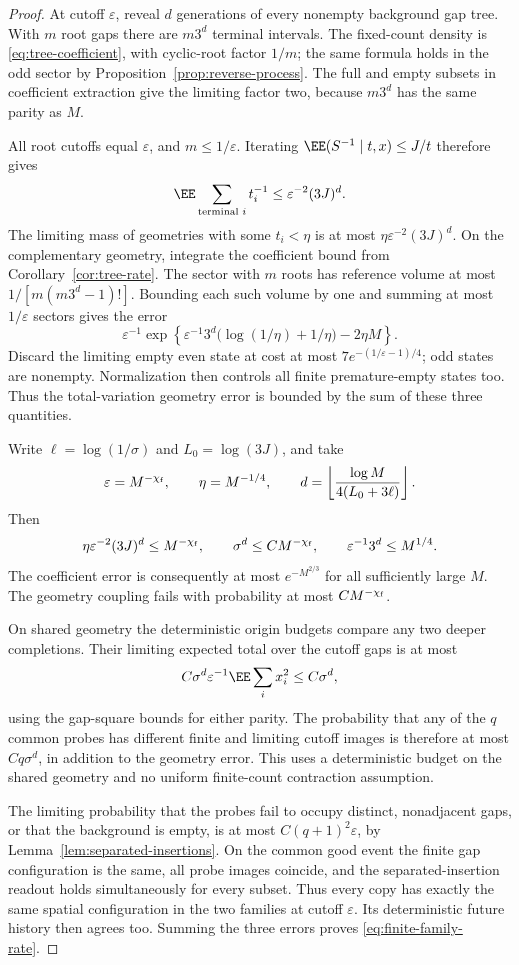 \documentclass[11pt,letterpaper]{article}
\begin{document}
\begin{proof}
At cutoff $\varepsilon$, reveal $d$ generations of every nonempty
background gap tree. With $m$ root gaps there are $m3^d$ terminal
intervals. The fixed-count density is \eqref{eq:tree-coefficient},
with cyclic-root factor $1/m$; the same formula holds in the odd
sector by Proposition~\ref{prop:reverse-process}. The full and empty
subsets in coefficient extraction give the limiting factor two,
because $m3^d$ has the same parity as $M$.

All root cutoffs equal $\varepsilon$, and $m\le1/\varepsilon$.
Iterating $\EE(S^{-1}\mid t,x)\le J/t$ therefore gives
\[
 \EE\sum_{\text{terminal }i}t_i^{-1}
       \le \varepsilon^{-2}(3J)^d.
\]
The limiting mass of geometries with some $t_i<\eta$ is at most
$\eta\varepsilon^{-2}(3J)^d$. On the complementary geometry,
integrate the coefficient bound from Corollary~\ref{cor:tree-rate}.
The sector with $m$ roots has reference volume at most
$1/[m(m3^d-1)!]$. Bounding each such volume by one and summing at
most $1/\varepsilon$ sectors gives the error
\[
 \varepsilon^{-1}\exp\left\{
   \varepsilon^{-1}3^d\bigl(\log(1/\eta)+1/\eta\bigr)-2\eta M
                         \right\}.
\]
Discard the limiting empty even state at cost at most
$7e^{-(1/\varepsilon-1)/4}$; odd states are nonempty.
Normalization then controls all finite premature-empty states too.
Thus the total-variation geometry error is bounded by the sum of
these three quantities.

Write $\ell=\log(1/\sigma)$ and $L_0=\log(3J)$, and take
\[
 \varepsilon=M^{-\chi_{\rm f}},\qquad \eta=M^{-1/4},
 \qquad d=\left\lfloor\frac{\log M}{4(L_0+3\ell)}\right\rfloor.
\]
Then
\[
 \eta\varepsilon^{-2}(3J)^d\le M^{-\chi_{\rm f}},
 \qquad \sigma^d\le C M^{-\chi_{\rm f}},
 \qquad \varepsilon^{-1}3^d\le M^{1/4}.
\]
The coefficient error is consequently at most $e^{-M^{2/3}}$ for
all sufficiently large $M$. The geometry coupling fails with
probability at most $CM^{-\chi_{\rm f}}$.

On shared geometry the deterministic origin budgets compare any
two deeper completions. Their limiting expected total over the
cutoff gaps is at most
\[
 C\sigma^d\varepsilon^{-1}\EE\sum_i x_i^2\le C\sigma^d,
\]
using the gap-square bounds for either parity. The probability that
any of the $q$ common probes has different finite and limiting
cutoff images is therefore at most $Cq\sigma^d$, in addition to
the geometry error. This uses a deterministic budget on the shared
geometry and no uniform finite-count contraction assumption.

The limiting probability that the probes fail to occupy distinct,
nonadjacent gaps, or that the background is empty, is at most
$C(q+1)^2\varepsilon$, by Lemma~\ref{lem:separated-insertions}.
On the common good event the finite gap configuration is the same,
all probe images coincide, and the separated-insertion readout
holds simultaneously for every subset. Thus every copy has exactly
the same spatial configuration in the two families at cutoff
$\varepsilon$. Its deterministic future history then agrees too.
Summing the three errors proves \eqref{eq:finite-family-rate}.
\end{proof}
\end{document}
